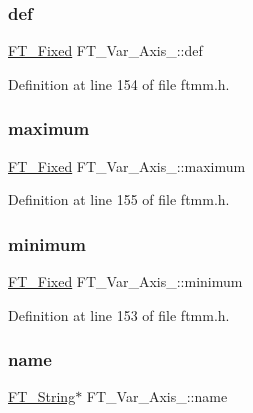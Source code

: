 \subsubsection{\texorpdfstring{def}{def}}
{\footnotesize\ttfamily \mbox{\hyperlink{fttypes_8h_a5f5a679cc09f758efdd0d1c5feed3c3d}{F\+T\+\_\+\+Fixed}} F\+T\+\_\+\+Var\+\_\+\+Axis\+\_\+\+::def}



Definition at line 154 of file ftmm.\+h.

\mbox{\label{struct_f_t___var___axis___a5704641439e9f318cf3c2b73864e3260}} 
\subsubsection{\texorpdfstring{maximum}{maximum}}
{\footnotesize\ttfamily \mbox{\hyperlink{fttypes_8h_a5f5a679cc09f758efdd0d1c5feed3c3d}{F\+T\+\_\+\+Fixed}} F\+T\+\_\+\+Var\+\_\+\+Axis\+\_\+\+::maximum}



Definition at line 155 of file ftmm.\+h.

\mbox{\label{struct_f_t___var___axis___aae13a8dea1c96bc3949019e8117e7edb}} 
\subsubsection{\texorpdfstring{minimum}{minimum}}
{\footnotesize\ttfamily \mbox{\hyperlink{fttypes_8h_a5f5a679cc09f758efdd0d1c5feed3c3d}{F\+T\+\_\+\+Fixed}} F\+T\+\_\+\+Var\+\_\+\+Axis\+\_\+\+::minimum}



Definition at line 153 of file ftmm.\+h.

\mbox{\label{struct_f_t___var___axis___a8d0e0af322a692999ec3733a3e18a5a4}} 
\subsubsection{\texorpdfstring{name}{name}}
{\footnotesize\ttfamily \mbox{\hyperlink{fttypes_8h_a9846214585359eb2ba6bbb0e6de30639}{F\+T\+\_\+\+String}}$\ast$ F\+T\+\_\+\+Var\+\_\+\+Axis\+\_\+\+::name}



